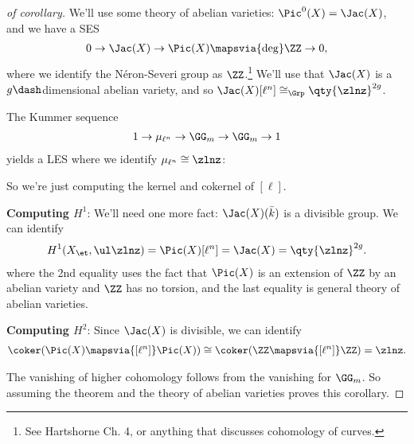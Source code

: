 \begin{proof}[of corollary]

We'll use some theory of abelian varieties: \(\Pic^0(X) = \Jac(X)\), and
we have a SES
\begin{align*}  
0 \to \Jac(X) \to \Pic(X) \mapsvia{\deg} \ZZ \to 0
,\end{align*} where we identify the Néron-Severi group as
\(\ZZ\).\footnote{See Hartshorne Ch. 4, or anything that discusses
  cohomology of curves.} We'll use that \(\Jac(X)\) is a
\(g\dash\)dimensional abelian variety, and so
\(\Jac(X)[\ell^n] \cong_{\Grp} \qty{\zlnz}^{2g}\).

The Kummer sequence
\begin{align*}  
1 \to \mu_{\ell^n}\to \GG_m \to \GG_m \to 1
\end{align*} yields a LES where we identify
\(\mu_{\ell^n} \cong \zlnz\):

\begin{center}
\end{center}

So we're just computing the kernel and cokernel of \([\ell]\).

\textbf{Computing \(H^1\)}: We'll need one more fact:
\(\Jac(X)(\bar k)\) is a divisible group. We can identify
\begin{align*}  
H^1(X_\et, \ul \zlnz)
=
\Pic(X)[\ell^n]
= 
\Jac(X)
=
\qty{\zlnz}^{2g}
.\end{align*} where the 2nd equality uses the fact that \(\Pic(X)\) is
an extension of \(\ZZ\) by an abelian variety and \(\ZZ\) has no
torsion, and the last equality is general theory of abelian varieties.

\textbf{Computing \(H^2\)}: Since \(\Jac(X)\) is divisible, we can
identify
\begin{align*}  
\coker(\Pic(X) \mapsvia{[\ell^n]} \Pic(X) )
\cong 
\coker(\ZZ \mapsvia{[\ell^n]} \ZZ )
= \zlnz
.\end{align*}

The vanishing of higher cohomology follows from the vanishing for
\(\GG_m\). So assuming the theorem and the theory of abelian varieties
proves this corollary.

\end{proof}

